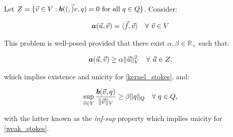 Let $Z = \{\vec{v} \in V: \bm{b}((, \vec{)}{v}, q) = 0 \text{ for all } q \in Q\}$. Consider:

\begin{gather} \label{kernel_stokes}
    \bm{a}(\vec{u}, \vec{v}) = \langle \vec{f}, \vec{v} \rangle \quad \forall ~ \vec{v} \in V
\end{gather}

This problem is well-posed provided that there exist $\alpha, \beta \in \mathbb{R}_+$ such that:

\begin{gather} \label{coercivity}
    \bm{a}(\vec{u}, \vec{v}) \geq \alpha \lVert \vec{u} \rVert^2_V \quad \forall ~ \vec{u} \in Z,
\end{gather}

which implies existence and unicity for \eqref{kernel_stokes}, and:

\begin{gather} \label{inf-sup}
    \sup_{\vec{v} \in V} \frac{\bm{b}(\vec{v}, q)}{\lVert \vec{v} \rVert_V} \geq \beta \lVert q \rVert_Q \quad \forall ~ q \in Q,
\end{gather}

with the latter known as the \textit{inf-sup} property which implies unicity for \eqref{weak_stokes}.